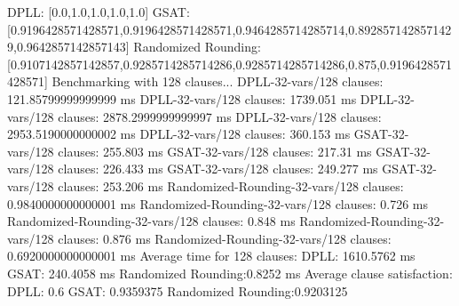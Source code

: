 \documentclass{article}
\begin{document}
  DPLL:               [0.0,1.0,1.0,1.0,1.0]\newline
  GSAT:               [0.9196428571428571,0.9196428571428571,0.9464285714285714,0.8928571428571429,0.9642857142857143]\newline
  Randomized Rounding:[0.9107142857142857,0.9285714285714286,0.9285714285714286,0.875,0.9196428571428571]\newline
\newline
\newline
Benchmarking with 128 clauses...\newline
DPLL-32-vars/128 clauses: 121.85799999999999 ms\newline
DPLL-32-vars/128 clauses: 1739.051 ms\newline
DPLL-32-vars/128 clauses: 2878.2999999999997 ms\newline
DPLL-32-vars/128 clauses: 2953.5190000000002 ms\newline
DPLL-32-vars/128 clauses: 360.153 ms\newline
GSAT-32-vars/128 clauses: 255.803 ms\newline
GSAT-32-vars/128 clauses: 217.31 ms\newline
GSAT-32-vars/128 clauses: 226.433 ms\newline
GSAT-32-vars/128 clauses: 249.277 ms\newline
GSAT-32-vars/128 clauses: 253.206 ms\newline
Randomized-Rounding-32-vars/128 clauses: 0.9840000000000001 ms\newline
Randomized-Rounding-32-vars/128 clauses: 0.726 ms\newline
Randomized-Rounding-32-vars/128 clauses: 0.848 ms\newline
Randomized-Rounding-32-vars/128 clauses: 0.876 ms\newline
Randomized-Rounding-32-vars/128 clauses: 0.6920000000000001 ms\newline
Average time for 128 clauses:\newline
  DPLL:               1610.5762 ms\newline
  GSAT:               240.4058 ms\newline
  Randomized Rounding:0.8252 ms\newline
Average clause satisfaction:\newline
  DPLL:               0.6\newline
  GSAT:               0.9359375\newline
  Randomized Rounding:0.9203125\newline
\end{document}
